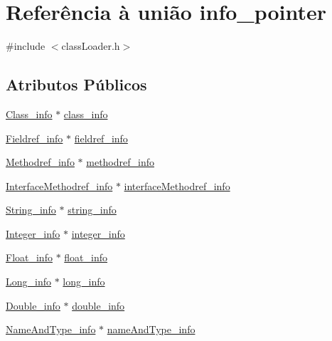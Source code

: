 \hypertarget{unioninfo__pointer}{}\section{Referência à união info\+\_\+pointer}
\label{unioninfo__pointer}


{\ttfamily \#include $<$class\+Loader.\+h$>$}

\subsection*{Atributos Públicos}
\begin{DoxyCompactItemize}
\item 
\hyperlink{struct_class__info}{Class\+\_\+info} $\ast$ \hyperlink{unioninfo__pointer_a2503ced8dac13ac48042f8b88d39cad1}{class\+\_\+info}
\item 
\hyperlink{struct_fieldref__info}{Fieldref\+\_\+info} $\ast$ \hyperlink{unioninfo__pointer_a85482dc8d14195f18c1de44d2dc833e7}{fieldref\+\_\+info}
\item 
\hyperlink{struct_methodref__info}{Methodref\+\_\+info} $\ast$ \hyperlink{unioninfo__pointer_a760a3b954cf255258b61a818c5d4ed07}{methodref\+\_\+info}
\item 
\hyperlink{struct_interface_methodref__info}{Interface\+Methodref\+\_\+info} $\ast$ \hyperlink{unioninfo__pointer_aa6168768151c8480bf01a20787bc165d}{interface\+Methodref\+\_\+info}
\item 
\hyperlink{struct_string__info}{String\+\_\+info} $\ast$ \hyperlink{unioninfo__pointer_ab42897bc57d173f34b4ffc004dc0c9bf}{string\+\_\+info}
\item 
\hyperlink{struct_integer__info}{Integer\+\_\+info} $\ast$ \hyperlink{unioninfo__pointer_a05c14a16d3495a2eeb21282cc9ea14fd}{integer\+\_\+info}
\item 
\hyperlink{struct_float__info}{Float\+\_\+info} $\ast$ \hyperlink{unioninfo__pointer_ab4a8a16c10bfcfa7ac7260d4e51d8efc}{float\+\_\+info}
\item 
\hyperlink{struct_long__info}{Long\+\_\+info} $\ast$ \hyperlink{unioninfo__pointer_a085ec961e30e67b88e20daac50c53f2a}{long\+\_\+info}
\item 
\hyperlink{struct_double__info}{Double\+\_\+info} $\ast$ \hyperlink{unioninfo__pointer_a9609953889d0cb1fd1b2909cb98eb573}{double\+\_\+info}
\item 
\hyperlink{struct_name_and_type__info}{Name\+And\+Type\+\_\+info} $\ast$ \hyperlink{unioninfo__pointer_a6fecafb432eea68dd658b66c527b2604}{name\+And\+Type\+\_\+info}

\end{DoxyCompactItemize}
